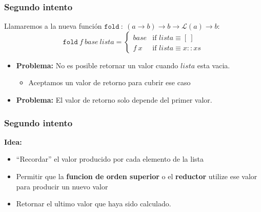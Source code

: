 \documentclass{beamer}
\begin{document}
\begin{frame}
    \frametitle{Segundo intento}
    Llamaremos a la nueva funci\'on $\mathtt{fold}\ :\ (a\rightarrow b)\rightarrow
        b \rightarrow \mathcal{L}(a)\rightarrow b$:
    $$
    \mathtt{fold}\ f\ base\ lista=\left\{
        \begin{array}{ll}
            base & \mbox{if }lista\equiv [\ ] \\
            f\ x & \mbox{if }lista\equiv x::xs
        \end{array}
    \right.
    $$
    \begin{itemize}
        \item{{\bf Problema: }No es posible retornar un valor cuando $lista$ esta vacia.
        \begin{itemize}
            \item{Aceptamos un valor de retorno para cubrir ese caso}
        \end{itemize}
        }
        \item{{\bf Problema: }El valor de retorno solo depende del primer valor.}
    \end{itemize}
\end{frame}

\begin{frame}
\frametitle{Segundo intento}
{\bf Idea:}
\begin{itemize}
    \item{``Recordar'' el valor producido por cada elemento de la lista}
    \item{Permitir que la {\bf funcion de orden superior} o el {\bf reductor}
    utilize ese valor para producir un nuevo valor}
    \item{Retornar el ultimo valor que haya sido calculado.}
\end{itemize}
\end{frame}
\end{document}
